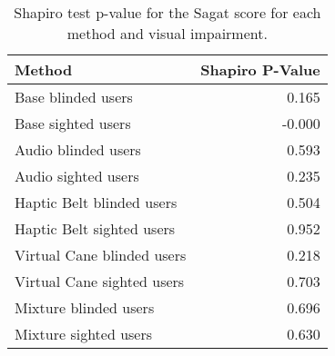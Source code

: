 
\begin{table}[!htb]
\centering
\caption{Shapiro test p-value for the Sagat score for each method and visual impairment.}
\label{tab:shapiro_sagat_score}
\begin{tabular}{lr}
\toprule
                    Method &  Shapiro P-Value \\
\midrule
        Base blinded users &            0.165 \\
        Base sighted users &           -0.000 \\
       Audio blinded users &            0.593 \\
       Audio sighted users &            0.235 \\
 Haptic Belt blinded users &            0.504 \\
 Haptic Belt sighted users &            0.952 \\
Virtual Cane blinded users &            0.218 \\
Virtual Cane sighted users &            0.703 \\
     Mixture blinded users &            0.696 \\
     Mixture sighted users &            0.630 \\
\bottomrule
\end{tabular}
\end{table}

